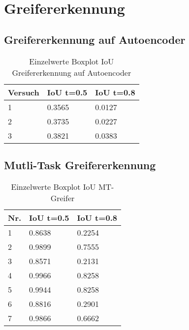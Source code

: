 \chapter{Greifererkennung}
\label{appendix:Greifererkennung}

	\section{Greifererkennung auf Autoencoder}
	\label{appendix:GreifererkennungAufAutoencoder}
	
		\begin{table}[ht]
		\centering
		\begin{tabularx}{\textwidth}{lll}
			\textbf{Versuch}  & \textbf{IoU t=0.5} & \textbf{IoU t=0.8}  	 \\ \hline 
			1 & 0.3565 & 0.0127 \\
			2 & 0.3735 & 0.0227 \\
			3 & 0.3821 & 0.0383 \\ 
		\end{tabularx}
		\caption{Einzelwerte Boxplot IoU Greifererkennung auf Autoencoder}
		\label{table:EinzelwerteBoxplotIoUGreifererkennungaufAutoencoder}
	\end{table}

	\section{Mutli-Task Greifererkennung}
	\label{appendix:MutliTaskGreifererkennung}
	
	\begin{table}[ht]
	\centering
	\begin{tabularx}{\textwidth}{lll}
		 \textbf{Nr.}  & \textbf{IoU t=0.5} & \textbf{IoU t=0.8}  	 \\ \hline 
		1 & 0.8638 & 0.2254 \\
		2 & 0.9899 & 0.7555 \\
		3 & 0.8571  & 0.2131 \\
		4 & 0.9966 & 0.8258 \\
		5 & 0.9944 & 0.8258  \\
		6 & 0.8816 & 0.2901 \\
		7 & 0.9866 & 0.6662 \\
	
	\end{tabularx}
	\caption{Einzelwerte Boxplot IoU MT-Greifer}
	\label{table:EinzelwerteBoxplotIoUMTGreifer}
\end{table}

